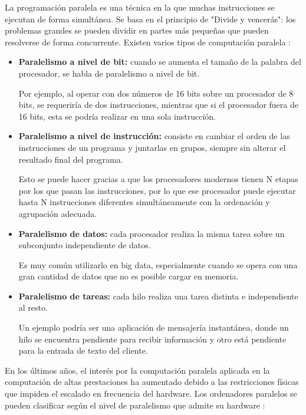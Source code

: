 La programación paralela es una técnica en la que muchas instrucciones se ejecutan de forma simultánea. Se basa en el principio de "Divide y vencerás": los problemas grandes se pueden dividir en partes más pequeñas que pueden resolverse de forma concurrente. 
\vspace{2mm}
Existen varios tipos de computación paralela \cite{tiposparalelismo}:
\vspace{2mm}
\begin{itemize}
    \item \textbf{Paralelismo a nivel de bit: } cuando se aumenta el tamaño de la palabra del procesador, se habla de paralelismo a nivel de bit.
    \vspace{2mm}

    Por ejemplo, al operar con dos números de 16 bits sobre un procesador de 8 bits, se requeriría de dos instrucciones, mientras que si el procesador fuera de 16 bits, esta se podría realizar en una sola instrucción.
    
    \item \textbf{Paralelismo a nivel de instrucción: } consiste en cambiar el orden de las instrucciones de un programa y juntarlas en grupos, siempre sin alterar el resultado final del programa.
    \vspace{2mm}

    Esto se puede hacer gracias a que los procesadores modernos tienen N etapas por los que pasan las instrucciones, por lo que ese procesador puede ejecutar hasta N instrucciones diferentes simultáneamente con la ordenación y agrupación adecuada.

    \item \textbf{Paralelismo de datos: } cada procesador realiza la misma tarea sobre un subconjunto independiente de datos. 
    
    Es muy común utilizarlo en big data, especialmente cuando se opera con una gran cantidad de datos que no es posible cargar en memoria.
    
    \item \textbf{Paralelismo de tareas: } cada hilo realiza una tarea distinta e independiente al resto.
    
    Un ejemplo podría ser una aplicación de mensajería instantánea, donde un hilo se encuentra pendiente para recibir información y otro está pendiente para la entrada de texto del cliente.
\end{itemize}
\vspace{2mm}

En los últimos años, el interés por la computación paralela aplicada en la computación de altas prestaciones ha aumentado debido a las restricciones físicas que impiden el escalado en frecuencia del hardware. Los ordenadores paralelos se pueden clasificar según el nivel de paralelismo que admite su hardware \cite{parallelcomputers}:
\vspace{2mm}


